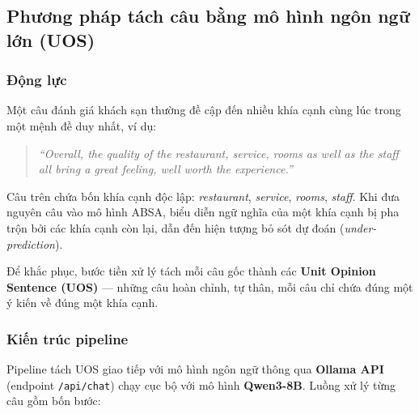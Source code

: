 
\subsection{Phương pháp tách câu bằng mô hình ngôn ngữ lớn (UOS)}
\label{subsec:uos_method}

\subsubsection*{Động lực}

Một câu đánh giá khách sạn thường đề cập đến nhiều khía cạnh cùng
lúc trong một mệnh đề duy nhất, ví dụ:

\begin{quote}
\textit{``Overall, the quality of the restaurant, service, rooms as well as
the staff all bring a great feeling, well worth the experience.''}
\end{quote}

Câu trên chứa bốn khía cạnh độc lập: \textit{restaurant},
\textit{service}, \textit{rooms}, \textit{staff}. Khi đưa nguyên câu
vào mô hình ABSA, biểu diễn ngữ nghĩa của một khía cạnh bị pha trộn
bởi các khía cạnh còn lại, dẫn đến hiện tượng bỏ sót dự đoán
(\textit{under-prediction}).

Để khắc phục, bước tiền xử lý tách mỗi câu gốc thành các
\textbf{Unit Opinion Sentence (UOS)} — những câu hoàn chỉnh, tự thân,
mỗi câu chỉ chứa đúng một ý kiến về đúng một khía cạnh.

\subsubsection*{Kiến trúc pipeline}

Pipeline tách UOS giao tiếp với mô hình ngôn ngữ thông qua
\textbf{Ollama API} (endpoint \texttt{/api/chat}) chạy cục bộ với mô
hình \textbf{Qwen3-8B}. Luồng xử lý từng câu gồm bốn bước:

